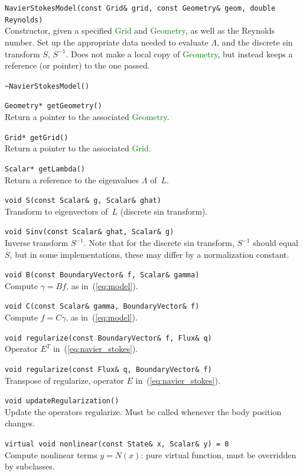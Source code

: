 \documentclass[11pt]{article}
\def\class#1{\textcolor{green}{\ttfamily\small #1}} %
\def\fn#1{{\ttfamily\small #1}} %
\let\code\lstinline
\begin{document}
\begin{description}
	\item \code|NavierStokesModel(const Grid& grid, const Geometry& geom, double Reynolds)|\\
		Constructor, given a specified \class{Grid} and \class{Geometry}, as well as the Reynolds number.  Set up the appropriate data needed to evaluate $\Lambda$, and the discrete sin transform $S$, $S^{-1}$.  Does not make a local copy of \class{Geometry}, but instead keeps a reference (or pointer) to the one passed.
	\item \code|~NavierStokesModel()|\\
	\item \code|Geometry* getGeometry()|\\
		Return a pointer to the associated \class{Geometry}.
	\item \code|Grid* getGrid()|\\
		Return a pointer to the associated \class{Grid}.
	\item \code|Scalar* getLambda()|\\
		Return a reference to the eigenvalues $\Lambda$ of~$L$.
	\item \code|void S(const Scalar& g, Scalar& ghat)|\\
		Transform to eigenvectors of~$L$ (discrete sin transform).
	\item \code|void Sinv(const Scalar& ghat, Scalar& g)|\\
		Inverse transform $S^{-1}$.  Note that for the discrete sin transform, $S^{-1}$ should equal~$S$, but in some implementations, these may differ by a normalization constant.
	\item \code|void B(const BoundaryVector& f, Scalar& gamma)|\\
		Compute $\gamma = Bf$, as in~(\ref{eq:model}).
	\item \code|void C(const Scalar& gamma, BoundaryVector& f)|\\
		Compute $f = C\gamma$, as in~(\ref{eq:model}).
	\item \code|void regularize(const BoundaryVector& f, Flux& q)|\\
		Operator $E^T$ in~(\ref{eq:navier_stokes}).
	\item \code|void regularize(const Flux& q, BoundaryVector& f)|\\
		Transpose of regularize, operator $E$ in~(\ref{eq:navier_stokes}).
	\item \code|void updateRegularization()|\\
		Update the operators \fn{regularize}.  Must be called whenever the body position changes.
	\item \code|virtual void nonlinear(const State& x, Scalar& y) = 0|\\
		Compute nonlinear terms $y = N(x)$: pure virtual function, must be overridden by subclasses.
\end{description}
\end{document}
